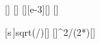[\Npm]
[\meter]
[\g][e-3][\kg]
[\mpss]

[s\,]{\sGX*sqrt(\kX/\mX)}[\mps]
[]{\kX*\sGX^2/(2*\mX*\gX)}[\meter]
